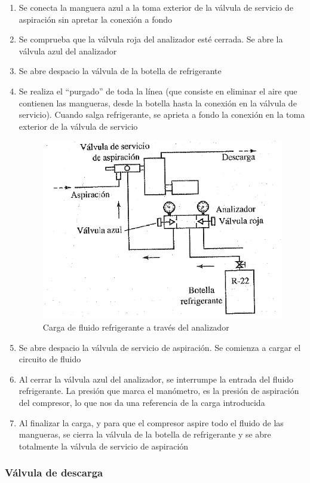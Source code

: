 \begin{enumerate}[1.]
    \item Se conecta la manguera azul a la toma exterior de la v\'alvula de servicio de aspiraci\'on sin apretar la conexi\'on a fondo
    \item Se comprueba que la v\'alvula roja del analizador est\'e cerrada. Se abre la v\'alvula azul del analizador
    \item Se abre despacio la v\'alvula de la botella de refrigerante
    \item Se realiza el ``purgado'' de toda la l\'inea (que consiste en eliminar el aire que contienen las mangueras, desde la botella hasta la conexi\'on en la v\'alvula de servicio). Cuando salga refrigerante, se aprieta a fondo la conexi\'on en la toma exterior de la v\'alvula de servicio
    \begin{figure}[H]
        \centering
        \includegraphics[width=.5\linewidth]{figuras/control-seguridad/carga-fluido-gas.png}
        \caption{Carga de fluido refrigerante a trav\'es del analizador}
        \label{fig:carga-fluido-gas}
    \end{figure}
    \item Se abre despacio la v\'alvula de servicio de aspiraci\'on. Se comienza a cargar el circuito de fluido
    \item Al cerrar la v\'alvula azul del analizador, se interrumpe la entrada del fluido refrigerante. La presi\'on que marca el man\'ometro, es la presi\'on de aspiraci\'on del compresor, lo que nos da una referencia de la carga introducida
    \item Al finalizar la carga, y para que el compresor aspire todo el fluido de las mangueras, se cierra la v\'alvula de la botella de refrigerante y se abre totalmente la v\'alvula de servicio de aspiraci\'on
\end{enumerate}

\subsubsection{V\'alvula de descarga}

